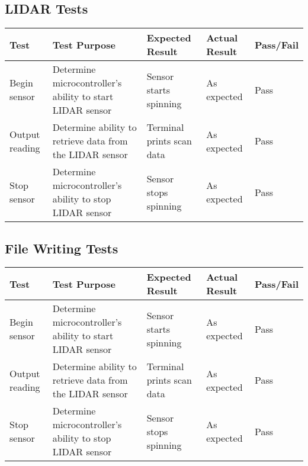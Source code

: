 \begin{landscape}
				\subsection{LIDAR Tests}
				\begin{table}[h!]
					\centering
					\label{table:lidartestbasic}
					\begin{tabular}{| p{2.5cm} | p{5cm} | p{4cm} | p{3cm} | p{1.5cm} |} 
						\hline
						Test & Test Purpose & Expected Result & Actual Result & Pass/Fail \\ [0.5ex] 
						\hline
						Begin sensor & Determine microcontroller's ability to start LIDAR sensor & Sensor starts spinning & As expected & Pass  \\
						
						Output reading & Determine ability to retrieve data from the LIDAR sensor & Terminal prints scan data & As expected & Pass \\
						 
						Stop sensor & Determine microcontroller's ability to stop LIDAR sensor & Sensor stops spinning & As expected & Pass   \\ [1ex] 
						\hline
					\end{tabular}		
				\end{table}
			
				\subsection{File Writing Tests}
				\begin{table}[h!]
					\centering
					\label{table:filewritingtests}
					\begin{tabular}{| p{2.5cm} | p{5cm} | p{4cm} | p{3cm} | p{1.5cm} |} 
						\hline
						Test & Test Purpose & Expected Result & Actual Result & Pass/Fail \\ [0.5ex] 
						\hline
						Begin sensor & Determine microcontroller's ability to start LIDAR sensor & Sensor starts spinning & As expected & Pass  \\
						
						Output reading & Determine ability to retrieve data from the LIDAR sensor & Terminal prints scan data & As expected & Pass \\
						
						Stop sensor & Determine microcontroller's ability to stop LIDAR sensor & Sensor stops spinning & As expected & Pass   \\ [1ex] 
						\hline
					\end{tabular}		
				\end{table}
			

\end{landscape}
